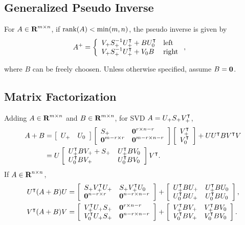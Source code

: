 \documentclass{article}
\begin{document}
\subsection{Generalized Pseudo Inverse}

    For $A\in\textbf{R}^{m\times n}$, if $\text{rank}(A)<\min(m,n)$, 
    the pseudo inverse is given by
    \begin{align*}
        A^+&=\left\{\begin{array}{lllllllllllllllllll}
            V_+ S_+^{-1} U_+^\intercal+BU_0^\intercal & \text{left}\\
            V_+ S_+^{-1} U_+^\intercal+V_0 B & \text{right}
        \end{array}\right.,
    \end{align*}

    where $B$ can be freely choosen.  Unless otherwise specified, assume $B=\textbf{0}$.


\subsection{Matrix Factorization}

    Adding $A\in\textbf{R}^{m\times n}$ and $B\in\textbf{R}^{m\times n}$, for SVD $A=U_+S_+V_+^\intercal$,
    \begin{align*}
        A+B &= \left[\begin{array}{lllllllllllllllllll}
                U_+ & U_0
                \end{array}\right]
            \left[\begin{array}{lllllllllllllllllll}
                    S_+ & \textbf{0}^{r\times n-r}\\
                    \textbf{0}^{m-r\times r} & \textbf{0}^{m-r\times n-r}
            \end{array}\right]
            \left[\begin{array}{lllllllllllllllllll}
                V_+^\intercal \\
                V_0^\intercal
            \end{array}\right]
            + UU^\intercal B V^\intercal V\\
            &= U
            \left[\begin{array}{lllllllllllllllllll}
                    U_+^\intercal B V_++S_+
                &
                U_+^\intercal B V_0
                \\
                U_0^\intercal B V_+ 
                &
                U_0^\intercal B V_0
            \end{array}\right]
            V^\intercal.
    \end{align*}
    If $A\in\textbf{R}^{n\times n}$,
    \begin{align*}
        U^\intercal (A+B) U 
            &=\left[\begin{array}{lllllllllllllllllll}
                S_+ V_+^\intercal U_+ & S_+ V_+^\intercal U_0\\
                \textbf{0}^{n-r\times r} & \textbf{0}^{n-r\times n-r}
            \end{array}\right]+        \left[\begin{array}{lllllllllllllllllll}
                U_+^\intercal B U_+
            &
            U_+^\intercal B U_0
            \\
            U_0^\intercal B U_+ 
            &
            U_0^\intercal B U_0
        \end{array}\right],\\
        V^\intercal (A+B) V 
            &=\left[\begin{array}{lllllllllllllllllll}
                V_+^\intercal U_+S_+ & \textbf{0}^{r\times n-r}\\
                V_0^\intercal U_+ S_+ & \textbf{0}^{n-r\times n-r}
            \end{array}\right]+        \left[\begin{array}{lllllllllllllllllll}
                V_+^\intercal B V_+
            &
            V_+^\intercal B V_0
            \\
            V_0^\intercal B V_+ 
            &
            V_0^\intercal B V_0
        \end{array}\right].
    \end{align*}
\end{document}
